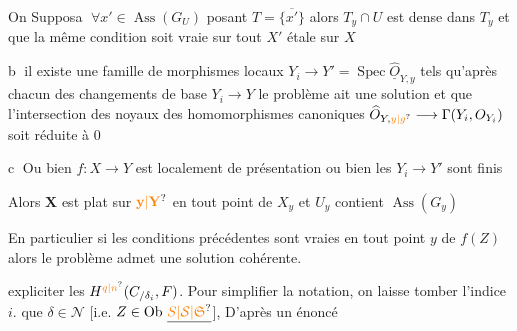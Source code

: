 On Suppos\textcircled{a} $\forall x'\in\operatorname{Ass}(G_U)$ posant $T=\overline{\{x'\}}$ alors
$T_y\cap U$ est dense dans $T_y$ et que la même condition
soit vraie sur tout $X'$ étale sur $X$

\textcircled{b} il existe une famille de
morphismes locaux $Y_i\longrightarrow Y'=\operatorname{Spec}\widehat{\underline O}_{Y,y}$
tels qu'après chacun des changements de
base $Y_i\longrightarrow Y$ le problème ait une solution
et que l'intersection des noyaux des homomorphismes
canoniques $\widehat O_{Y,\unsure{y|g}}\longrightarrow\Gamma(Y_i,O_{Y_i})$ soit
réduite à $0$

\textcircled{c} Ou bien $f\colon X\longrightarrow Y$ est localement
de présentation  ou bien les $Y_i\longrightarrow Y'$
sont finis

Alors $\mathbf X$ est plat sur $\unsure{\mathbf y|\mathbf Y}$ en tout point de $X_y$
et $U_y$ contient $\operatorname{Ass}(G_y)$

En particulier si les conditions  précédentes
sont vraies en tout point $y$ de $f(Z)$ alors le
problème admet une solution cohérente.


expliciter les $H^{\unsure{q|n}}(C_{/\delta_i},F)$. Pour simplifier
la notation, on laisse tomber
l'indice $i$.  
que $\delta\in\mathcal N$ [i.e. $Z\in\operatorname{Ob}\,\underline{\unsure{S|\mathcal S|\mathfrak S}}$],
 D'après un énoncé

